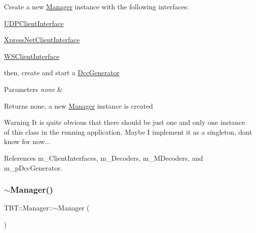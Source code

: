 Create a new \hyperlink{classTBT_1_1Manager}{Manager} instance with the following interfaces\+:


\begin{DoxyItemize}
\item \hyperlink{classTBT_1_1UDPClientInterface}{U\+D\+P\+Client\+Interface}
\item \hyperlink{classTBT_1_1XpressNetClientInterface}{Xpress\+Net\+Client\+Interface}
\item \hyperlink{classTBT_1_1WSClientInterface}{W\+S\+Client\+Interface}
\end{DoxyItemize}

then, create and start a \hyperlink{classTBT_1_1DccGenerator}{Dcc\+Generator}


\begin{DoxyParams}{Parameters}
{\em none} & \\
\hline
\end{DoxyParams}
\begin{DoxyReturn}{Returns}
none, a new \hyperlink{classTBT_1_1Manager}{Manager} instance is created
\end{DoxyReturn}
\begin{DoxyWarning}{Warning}
It is quite obvious that there should be just one and only one instance of this class in the running application. Maybe I implement it as a singleton, don\textquotesingle{}t know for now... 
\end{DoxyWarning}


References m\+\_\+\+Client\+Interfaces, m\+\_\+\+Decoders, m\+\_\+\+M\+Decoders, and m\+\_\+p\+Dcc\+Generator.

\mbox{\label{classTBT_1_1Manager_a431bd969c21eec974597b15d2208f19f_a431bd969c21eec974597b15d2208f19f}} 
\subsubsection{\texorpdfstring{$\sim$\+Manager()}{~Manager()}}
{\footnotesize\ttfamily T\+B\+T\+::\+Manager\+::$\sim$\+Manager (\begin{DoxyParamCaption}{ }\end{DoxyParamCaption})\hspace{0.3cm}{\ttfamily [virtual]}}



